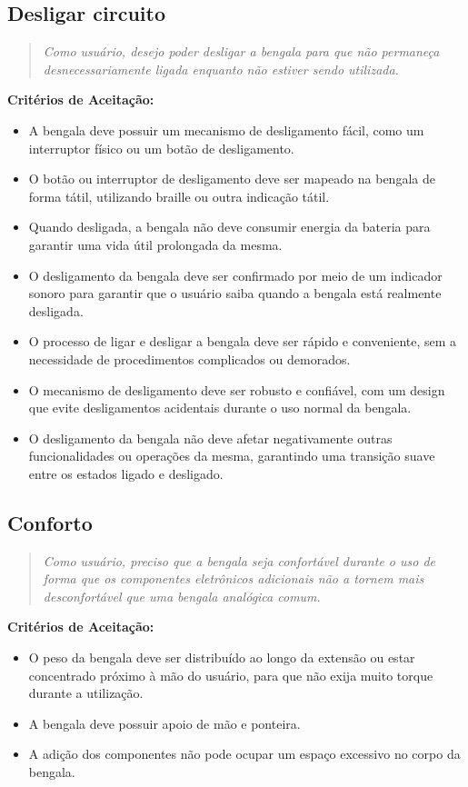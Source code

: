     \subsection{Desligar circuito}
    \begin{quote}
    \textit{Como usuário, desejo poder desligar a bengala para que não permaneça desnecessariamente ligada enquanto não estiver sendo utilizada.}
    \end{quote}    
    \noindent\textbf{Critérios de Aceitação:}
    \begin{itemize}
        \item A bengala deve possuir um mecanismo de desligamento fácil, como um interruptor físico ou um botão de desligamento.
        \item O botão ou interruptor de desligamento deve ser mapeado na bengala de forma tátil, utilizando braille ou outra indicação tátil.
        \item Quando desligada, a bengala não deve consumir energia da bateria para garantir uma vida útil prolongada da mesma.
        \item O desligamento da bengala deve ser confirmado por meio de um indicador sonoro para garantir que o usuário saiba quando a bengala está realmente desligada.
        \item O processo de ligar e desligar a bengala deve ser rápido e conveniente, sem a necessidade de procedimentos complicados ou demorados.
        \item O mecanismo de desligamento deve ser robusto e confiável, com um design que evite desligamentos acidentais durante o uso normal da bengala.
        \item O desligamento da bengala não deve afetar negativamente outras funcionalidades ou operações da mesma, garantindo uma transição suave entre os estados ligado e desligado.
    \end{itemize}
                        
    \subsection{Conforto}
    \begin{quote}
    \textit{Como usuário, preciso que a bengala seja confortável durante o uso de forma que os componentes eletrônicos adicionais não a tornem mais desconfortável que uma bengala analógica comum.}
    \end{quote}    
    \noindent\textbf{Critérios de Aceitação:}
    \begin{itemize}
        \item O peso da bengala deve ser distribuído ao longo da extensão ou estar concentrado próximo à mão do usuário, para que não exija muito torque durante a utilização.
        \item A bengala deve possuir apoio de mão e ponteira.
        \item A adição dos componentes não pode ocupar um espaço excessivo no corpo da bengala.
    \end{itemize}

